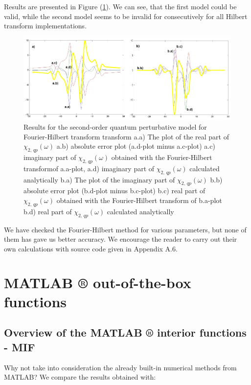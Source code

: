 \documentclass[12pt,twoside,a4paper]{article}
\numberwithin{equation}{subsection}
\numberwithin{figure}{subsection}
\begin{document}
Results are presented in Figure (\ref{fig:four_qp2}). We can see, that the first model could be valid, while the second model seems to
be invalid for consecutively for all Hilbert transform implementations.

\begin{figure} 
  \includegraphics[width=150mm]{img/four_qp2.png}
  \caption{Results for the second-order quantum perturbative model for Fourier-Hilbert transform transform
     a.a) The plot of the real part of ${\chi_{2, \,qp}}(\omega )$
     a.b) absolute error plot (a.d-plot minus a.c-plot)
     a.c) imaginary part of $\chi_{2, \, qp} (\omega )$ obtained with the Fourier-Hilbert transformof a.a-plot, 
     a.d) imaginary part of $\chi_{2, \, qp} (\omega )$ calculated analytically 
     b.a) The plot of the imaginary part of ${\chi_{2, \, qp}}(\omega )$ 
     b.b) absolute error plot (b.d-plot minus b.c-plot)
     b.c) real part of $\chi_{2, \, qp} (\omega )$ obtained with the Fourier-Hilbert transform of b.a-plot 
     b.d) real part of $\chi_{2, \, qp} (\omega )$ calculated analytically 
     \label{fig:four_qp2}
     }
\end{figure} 

We have checked the Fourier-Hilbert method for various parameters, but none of them has gave us better accuracy. We
encourage the reader to carry out their own calculations with source code given in Appendix A.6.

\section{MATLAB ® out-of-the-box functions} \label{chap:matlab}

\subsection{Overview of the MATLAB ® interior functions - MIF} \label{chap:matlab_overview}

Why not take into consideration the already built-in numerical methods from MATLAB? We compare the results obtained with: 
\end{document}
